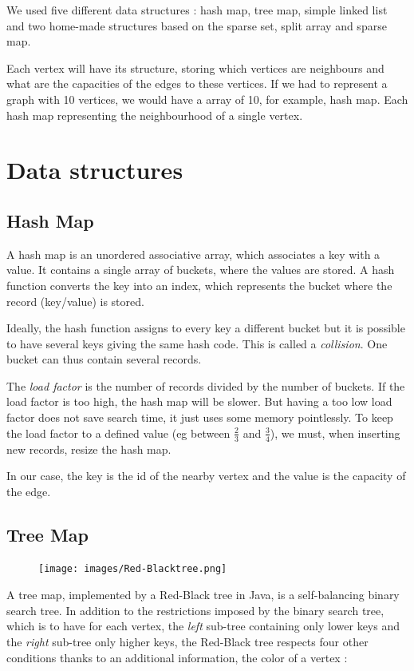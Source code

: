 We used five different data structures : hash map, tree map, simple linked list and two home-made structures based on the sparse set, split array and sparse map. 

Each vertex will have its structure, storing which vertices are neighbours and what are the capacities of the edges to these vertices. If we had to represent a graph with 10 vertices, we would have a array of 10, for example, hash map. Each hash map representing the neighbourhood of a single vertex.

\section{Data structures}
\subsection{Hash Map}
A hash map is an unordered associative array, which associates a key with a value. It contains a single array of buckets, where the values are stored. A hash function converts the key into an index, which represents the bucket where the record (key/value) is stored. \newline

Ideally, the hash function assigns to every key a different bucket but it is possible to have several keys giving the same hash code. This is called a \textit{collision}. One bucket can thus contain several records. \newline

The \textit{load factor} is the number of records divided by the number of buckets.  If the load factor is too high, the hash map will be slower. But having a too low load factor does not save search time, it just uses some memory pointlessly. To keep the load factor to a defined value (eg between $\frac{2}{3}$ and $\frac{3}{4}$), we must, when inserting new records, resize the hash map. \newline

In our case, the key is the id of the nearby vertex and the value is the capacity of the edge.

\subsection{Tree Map}

\begin{figure}
	\vspace{-8mm}
	\texttt{[image: images/Red-Blacktree.png]}
\end{figure}
A tree map, implemented by a Red-Black tree in Java, is a self-balancing binary search tree. In addition to the restrictions imposed by the binary search tree, which is to have for each vertex, the \textit{left} sub-tree containing only lower keys and the \textit{right} sub-tree only higher keys, the Red-Black tree respects four other conditions thanks to an additional information, the color of a vertex :

